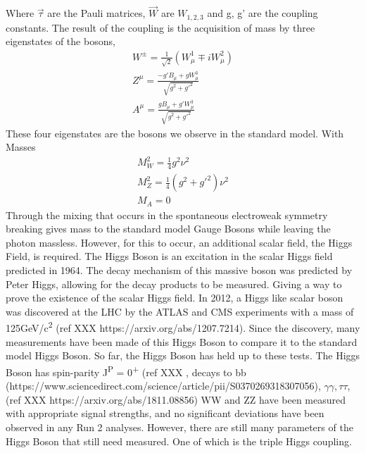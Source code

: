 Where ${\overrightarrow{\tau}}$ are the Pauli matrices, ${\overrightarrow{W}}$ are ${W_{1,2,3}}$ and g, g' are the coupling constants. The result of the coupling is the acquisition of mass by three eigenstates of the bosons, 
\begin{equation}
\begin{split}
W^{\pm} = \frac{1}{\sqrt{2}}(W^{1}_{\mu} \mp iW^{2}_{\mu})\\
Z^{\mu} = \frac{-g'B_{\mu} + gW^{3}_{\mu}}{\sqrt{g^{2} + g'^{2}}}\\
A^{\mu} = \frac{gB_{\mu} + g'W^{3}_{\mu}}{\sqrt{g^{2} + g'^{2}}}
\end{split}
\end{equation}
These four eigenstates are the bosons we observe in the standard model. With Masses
\begin{equation}
\begin{split}
M^{2}_{W} = \frac{1}{4}g^{2}\nu^{2} \\
M^{2}_{Z} = \frac{1}{4}(g^{2} + g'^{2})\nu^{2} \\
M_{A} = 0
\end{split}
\end{equation}
Through the mixing that occurs in the spontaneous electroweak symmetry breaking gives mass to the standard model Gauge Bosons while leaving the photon massless. However, for this to occur, an additional scalar field, the Higgs Field, is required.\linebreak
\indent The Higgs Boson is an excitation in the scalar Higgs field predicted in 1964. The decay mechanism of this massive boson was predicted by Peter Higgs, allowing for the decay products to be measured. Giving a way to prove the existence of the scalar Higgs field. In 2012, a Higgs like scalar boson was discovered at the LHC by the ATLAS and CMS experiments with a mass of 125GeV/c\textsuperscript{2} (ref XXX https://arxiv.org/abs/1207.7214). Since the discovery, many measurements have been made of this Higgs Boson to compare it to the standard model Higgs Boson. So far, the Higgs Boson has held up to these tests. The Higgs Boson has spin-parity J\textsuperscript{P} = 0\textsuperscript{+} 
(ref XXX %
, decays to bb (https://www.sciencedirect.com/science/article/pii/S0370269318307056), ${\gamma\gamma, \tau\tau}$,(ref XXX https://arxiv.org/abs/1811.08856) WW and ZZ have been measured with appropriate signal strengths, and no significant deviations have been observed in any Run 2 analyses. However, there are still many parameters of the Higgs Boson that still need measured. One of which is the triple Higgs coupling.
